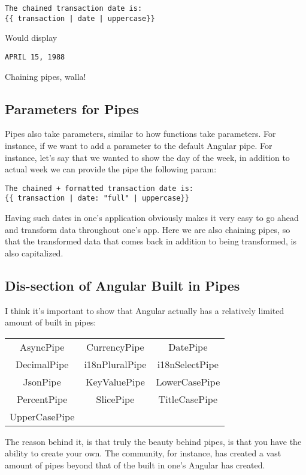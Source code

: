 \begin{lstlisting}
The chained transaction date is:
{{ transaction | date | uppercase}}
\end{lstlisting}

Would display
\begin{verbatim}
APRIL 15, 1988
\end{verbatim}

Chaining pipes, walla!

\subsection{Parameters for Pipes}
Pipes also take parameters, similar to how functions take parameters. For
instance, if we want to add a parameter to the default Angular pipe. For
instance, let's say that we wanted to show the day of the week, in addition to
actual week we can provide the pipe the following param:

\begin{lstlisting}
The chained + formatted transaction date is:
{{ transaction | date: "full" | uppercase}}
\end{lstlisting}

Having such dates in one's application obviously makes it very easy to go ahead
and transform data throughout one's app. Here we are also chaining pipes, so
that the transformed data that comes back in addition to being transformed, is
also capitalized.

\subsection{ Dis-section of Angular Built in Pipes }
I think it's important to show that Angular actually has a relatively limited
amount of built in pipes:
\begin{center}
\begin{tabular}{ c c c }
 AsyncPipe & CurrencyPipe & DatePipe \\
 DecimalPipe & i18nPluralPipe & i18nSelectPipe \\
 JsonPipe & KeyValuePipe & LowerCasePipe \\
 PercentPipe & SlicePipe & TitleCasePipe \\
 UpperCasePipe
\end{tabular}
\end{center}

The reason behind it, is that truly the beauty behind pipes, is that you have
the ability to create your own. The community, for instance, has created a vast
amount of pipes beyond that of the built in one's Angular has created.

